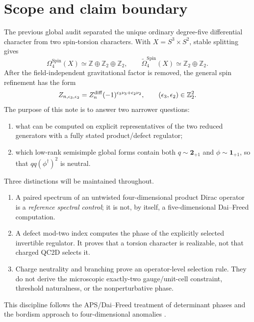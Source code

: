 \documentclass[11pt]{article}
\theoremstyle{definition}
\theoremstyle{remark}
\newcommand{\ZZ}{\mathbb Z}
\begin{document}
\tableofcontents

\section{Scope and claim boundary}

The previous global audit separated the unique ordinary degree-five
differential character from two spin-torsion characters.  With
\(X=S^3\times S^2\), stable splitting gives
\begin{equation}
 \Omega_4^{\mathrm{Spin}}(X)
 \simeq \ZZ\oplus\ZZ_2\oplus\ZZ_2,
 \qquad
 \widetilde\Omega_4^{\mathrm{Spin}}(X)
 \simeq\ZZ_2\oplus\ZZ_2.
 \label{eq:bordism}
\end{equation}
After the field-independent gravitational factor is removed, the general
spin refinement has the form
\begin{equation}
 Z_{n,\epsilon_3,\epsilon_2}
 =Z_n^{\rm diff}
 (-1)^{\epsilon_3\nu_3+\epsilon_2\nu_2},
 \qquad (\epsilon_3,\epsilon_2)\in\ZZ_2^2.
 \label{eq:four-characters}
\end{equation}
The purpose of this note is to answer two narrower questions:
\begin{enumerate}[label=(Q\arabic*)]
\item what can be computed on explicit representatives of the two reduced
  generators with a fully stated product/defect regulator;
\item which low-rank semisimple global forms contain both
  \(q\sim\bm2_{+1}\) and \(\phi\sim\bm1_{+1}\), so that
  \(qq(\phi^\dagger)^2\) is neutral.
\end{enumerate}

Three distinctions will be maintained throughout.
\begin{enumerate}
\item A paired spectrum of an untwisted four-dimensional product Dirac
  operator is a \emph{reference spectral control}; it is not, by itself, a
  five-dimensional Dai--Freed computation.
\item A defect mod-two index computes the phase of the explicitly selected
  invertible regulator.  It proves that a torsion character is realizable,
  not that charged QC2D selects it.
\item Charge neutrality and branching prove an operator-level selection
  rule.  They do not derive the microscopic exactly-two gauge/unit-cell
  constraint, threshold naturalness, or the nonperturbative phase.
\end{enumerate}
This discipline follows the APS/Dai--Freed treatment of determinant phases
\cite{AtiyahPatodiSinger1975,DaiFreed1994,Yonekura2019} and the bordism
approach to four-dimensional anomalies
\cite{DavighiGripaiosLohitsiri2020,Saito2024}.
\end{document}
